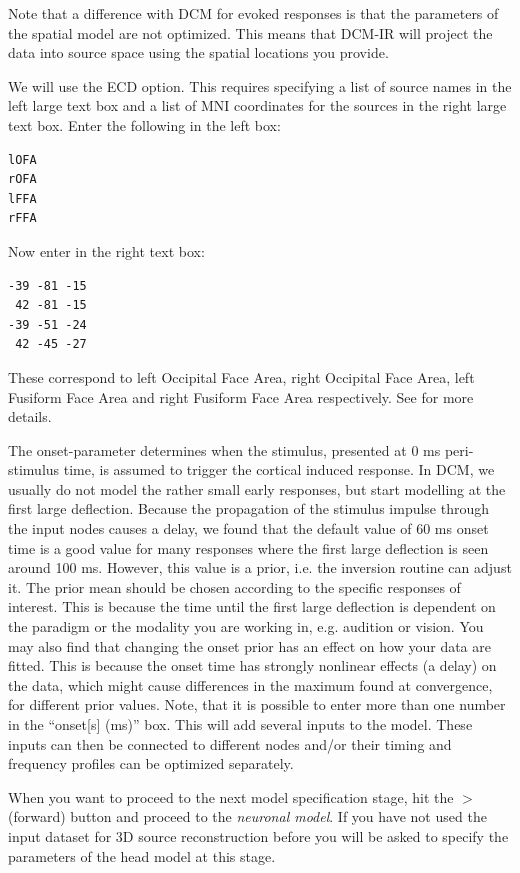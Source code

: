 Note that a difference with DCM for evoked responses is that the parameters of the spatial model are not optimized. This means that DCM-IR will project the data into source space using the spatial locations you provide.

We will use the ECD option. This requires specifying a list of source names in the left large text box and a list of MNI coordinates for the sources in the right large text box. Enter the following in the left box:

\begin{verbatim}
lOFA
rOFA
lFFA
rFFA
\end{verbatim}

Now enter in the right text box:

\begin{verbatim}
-39 -81 -15
 42 -81 -15
-39 -51 -24
 42 -45 -27
\end{verbatim}

These correspond to left Occipital Face Area, right Occipital Face Area, left Fusiform Face Area and right Fusiform Face Area respectively. See \cite{cc_induced} for more details.

The onset-parameter determines when the stimulus, presented at 0 ms peri-stimulus time, is assumed to trigger the cortical induced response. In DCM, we usually do not model the rather small early responses, but start modelling at the first large deflection. Because the propagation of the stimulus impulse through the input nodes causes a delay, we found that the default value of 60
ms onset time is a good value for many responses where the first large deflection is seen around 100 ms. However, this value is a
prior, i.e. the inversion routine can adjust it. The prior mean should be chosen according to the specific responses of interest. This is because the time until the first large deflection is dependent on the paradigm or the modality you are working in, e.g. audition or vision. You may also find that changing the onset prior has an effect on how your data are
fitted. This is because the onset time has strongly nonlinear effects (a delay) on the data, which might cause differences in the maximum found at convergence, for different prior values. Note, that it is possible to enter more than one number in the ``onset[s] (ms)'' box. This will add several inputs to the model. These inputs can then be connected to different nodes and/or their timing and frequency profiles can be optimized separately.

When you want to proceed to the next model specification stage, hit the $>$ (forward) button and proceed to the \textit{neuronal model}. If you have not used the input dataset for 3D source reconstruction before you will be asked to specify the parameters of the head model at this stage.

